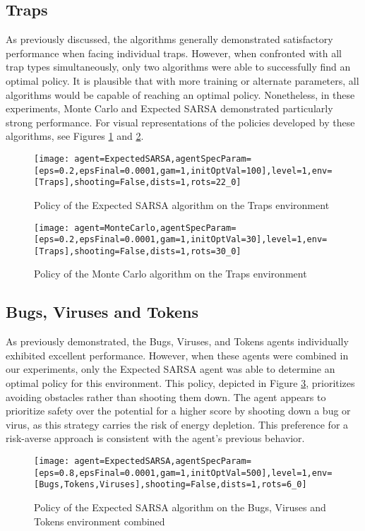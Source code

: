 \subsection{Traps}
As previously discussed, the algorithms generally demonstrated satisfactory performance when facing individual traps. However, when confronted with all trap types simultaneously, only two algorithms were able to successfully find an optimal policy. It is plausible that with more training or alternate parameters, all algorithms would be capable of reaching an optimal policy. Nonetheless, in these experiments, Monte Carlo and Expected SARSA demonstrated particularly strong performance. For visual representations of the policies developed by these algorithms, see Figures \ref{fig:estraps} and \ref{fig:mctraps}.

\begin{figure}[h]
    \centering
    \texttt{[image: agent=ExpectedSARSA,agentSpecParam=[eps=0.2,epsFinal=0.0001,gam=1,initOptVal=100],level=1,env=[Traps],shooting=False,dists=1,rots=22\_0]}
    \caption{Policy of the Expected SARSA algorithm on the Traps environment}
    \label{fig:estraps}
\end{figure}


\begin{figure}[h]
    \centering
    \texttt{[image: agent=MonteCarlo,agentSpecParam=[eps=0.2,epsFinal=0.0001,gam=1,initOptVal=30],level=1,env=[Traps],shooting=False,dists=1,rots=30\_0]}
    \caption{Policy of the Monte Carlo algorithm on the Traps environment}
    \label{fig:mctraps}
\end{figure}

\subsection{Bugs, Viruses and Tokens}
As previously demonstrated, the Bugs, Viruses, and Tokens agents individually exhibited excellent performance. However, when these agents were combined in our experiments, only the Expected SARSA agent was able to determine an optimal policy for this environment. This policy, depicted in Figure \ref{fig:esbvt}, prioritizes avoiding obstacles rather than shooting them down. The agent appears to prioritize safety over the potential for a higher score by shooting down a bug or virus, as this strategy carries the risk of energy depletion. This preference for a risk-averse approach is consistent with the agent's previous behavior.

\begin{figure}[h]
    \centering
    \texttt{[image: agent=ExpectedSARSA,agentSpecParam=[eps=0.8,epsFinal=0.0001,gam=1,initOptVal=500],level=1,env=[Bugs,Tokens,Viruses],shooting=False,dists=1,rots=6\_0]}
	\caption{Policy of the Expected SARSA algorithm on the Bugs, Viruses and Tokens environment combined}    
    \label{fig:esbvt}
\end{figure}

